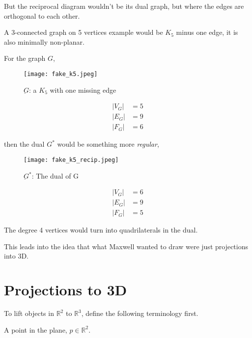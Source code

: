 \documentclass{article}
\begin{document}
    But the reciprocal diagram wouldn't be its dual graph, but where the edges are orthogonal to each other.
    
    A 3-connected graph on 5 vertices example would be $K_5$ minus one edge, it is also minimally non-planar.
    
    For the graph $G$,
    
    \begin{figure}[h!]
            \centering
            \texttt{[image: fake\_k5.jpeg]}
            \caption{$\underbar{G}$: a $K_5$ with one missing edge}
    \end{figure}
    
    \begin{align}
        |V_G| &= 5 \\
        |E_G| &= 9 \\
        |F_G| &= 6
    \end{align}
    
    then the dual $G^*$ would be something more \textit{regular},
    
    \begin{figure}[H]
        \centering
        \texttt{[image: fake\_k5\_recip.jpeg]}
        \caption{$\underbar{G}$$^*$: The dual of G}
    \end{figure}
    
     \begin{align}
        |V_G| &= 6 \\
        |E_G| &= 9 \\
        |F_G| &= 5
    \end{align}
    
    \begin{remark}
        The degree 4 vertices would turn into quadrilaterals in the dual.
    \end{remark}
    
    This leads into the idea that what Maxwell wanted to draw were just projections into 3D.
    
    \section{Projections to 3D}
    
    To lift objects in $\mathbb{R}^2$ to $\mathbb{R}^3$, define the following terminology first.
    
    \begin{definition}
        A point in the plane, $p \in \mathbb{R}^2$.
    \end{definition}
    
\end{document}
